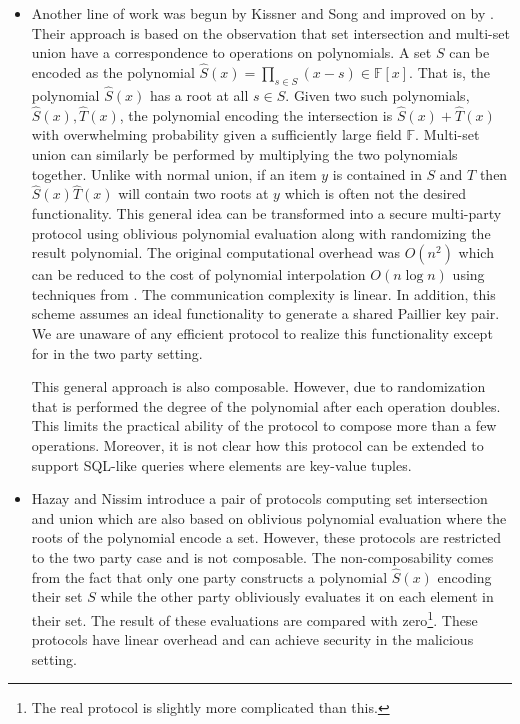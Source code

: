 \begin{itemize}
\item Another line of work was begun by Kissner and Song\cite{KS06} and improved on by \cite{MF06}. Their approach is based on the observation that set intersection and multi-set union have a correspondence to operations on polynomials. A set $S$ can be encoded as the polynomial $\hat S(x)= \prod_{s\in S}(x-s)\in \mathbb{F}[x]$. That is, the polynomial $\hat S(x)$ has a root at all $s\in S$. Given two such polynomials, $\hat S(x), \hat T(x)$, the polynomial encoding the intersection is $\hat S(x)+\hat T(x)$ with overwhelming probability given a sufficiently large field $\mathbb{F}$. Multi-set union can similarly be performed by multiplying the two polynomials together. Unlike with normal union, if an item $y$ is contained in $S$ and $T$ then $\hat S(x)\hat T(x)$ will contain two roots at $y$ which is often not the desired functionality. This general idea can be transformed into a secure multi-party protocol using oblivious polynomial evaluation\cite{???} along with randomizing the result polynomial. The original computational overhead was $O(n^2)$ which can be reduced to the cost of polynomial interpolation $O(n\log n)$ using techniques from \cite{MF06}. The communication complexity is linear. In addition, this scheme assumes an ideal functionality to generate a shared Paillier key pair. We are unaware of any efficient protocol to realize this functionality except for \cite{RSA:HMRT12} in the two party setting.

This general approach is also composable. However, due to randomization that is performed the degree of the polynomial after each operation doubles. This limits the practical ability of the protocol to compose more than a few operations. Moreover, it is not clear how this protocol can be extended to support SQL-like queries where elements are key-value tuples.

\item Hazay and Nissim introduce a pair of protocols computing set intersection and union which are also based on oblivious polynomial evaluation where the roots of the polynomial encode a set. However, these protocols are restricted to the two party case and is not composable. The non-composability comes from the fact that only one party constructs a polynomial $\hat S(x)$ encoding their set $S$ while the other party obliviously evaluates it on each element in their set. The result of these evaluations are compared with zero\footnote{The real protocol is slightly more complicated than this.}. These protocols have linear overhead and can achieve security in the malicious setting.


\end{itemize}
